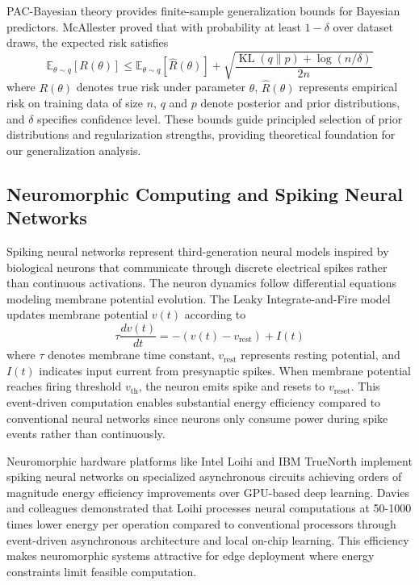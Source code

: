 \documentclass[10pt,journal,compsoc]{IEEEtran}
\DeclareMathOperator{\KL}{KL}
\begin{document}
PAC-Bayesian theory provides finite-sample generalization bounds for Bayesian predictors. McAllester proved that with probability at least $1-\delta$ over dataset draws, the expected risk satisfies
\begin{equation}
\mathbb{E}_{\theta \sim q}[R(\theta)] \leq \mathbb{E}_{\theta \sim q}[\hat{R}(\theta)] + \sqrt{\frac{\KL(q \| p) + \log(n/\delta)}{2n}}
\end{equation}
where $R(\theta)$ denotes true risk under parameter $\theta$, $\hat{R}(\theta)$ represents empirical risk on training data of size $n$, $q$ and $p$ denote posterior and prior distributions, and $\delta$ specifies confidence level. These bounds guide principled selection of prior distributions and regularization strengths, providing theoretical foundation for our generalization analysis.

\subsection{Neuromorphic Computing and Spiking Neural Networks}

Spiking neural networks represent third-generation neural models inspired by biological neurons that communicate through discrete electrical spikes rather than continuous activations. The neuron dynamics follow differential equations modeling membrane potential evolution. The Leaky Integrate-and-Fire model updates membrane potential $v(t)$ according to
\begin{equation}
\tau \frac{dv(t)}{dt} = -(v(t) - v_{\text{rest}}) + I(t)
\end{equation}
where $\tau$ denotes membrane time constant, $v_{\text{rest}}$ represents resting potential, and $I(t)$ indicates input current from presynaptic spikes. When membrane potential reaches firing threshold $v_{\text{th}}$, the neuron emits spike and resets to $v_{\text{reset}}$. This event-driven computation enables substantial energy efficiency compared to conventional neural networks since neurons only consume power during spike events rather than continuously.

Neuromorphic hardware platforms like Intel Loihi and IBM TrueNorth implement spiking neural networks on specialized asynchronous circuits achieving orders of magnitude energy efficiency improvements over GPU-based deep learning. Davies and colleagues demonstrated that Loihi processes neural computations at 50-1000 times lower energy per operation compared to conventional processors through event-driven asynchronous architecture and local on-chip learning. This efficiency makes neuromorphic systems attractive for edge deployment where energy constraints limit feasible computation.
\end{document}
